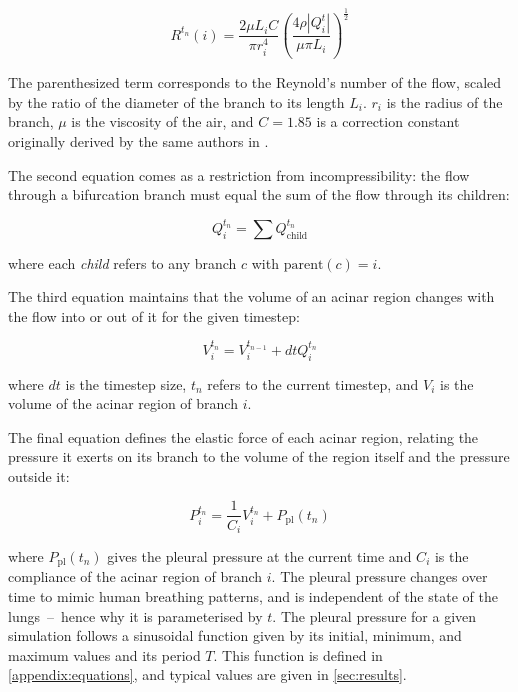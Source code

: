 \begin{equation*}
    R^{t_n}(i) = \frac{2 \mu L_i C}{\pi r_i^4} \left( \frac{4 \rho |Q_i^t|}{\mu \pi L_i} \right)^{\frac{1}{2}}
\end{equation*}

The parenthesized term corresponds to the Reynold's number of the flow, scaled by the ratio of the
diameter of the branch to its length $L_i$. $r_i$ is the radius of the branch, $\mu$ is the
viscosity of the air, and $C = 1.85$ is a correction constant originally derived by the same authors
in \cite{PedleyEtAl1970a}.

\breakpars

The second equation comes as a restriction from incompressibility: the flow through a bifurcation
branch must equal the sum of the flow through its children:

\begin{equation}
    Q_i^{t_n} = \sum Q_{\text{child}}^{t_n}
\end{equation}

\noindent
where each \textit{child} refers to any branch $c$ with $\text{parent}(c) = i$.

The third equation maintains that the volume of an acinar region changes with the flow into or out
of it for the given timestep:

\begin{equation}
    V_i^{t_n} = V_i^{t_{n-1}} + dt Q_i^{t_n}
\end{equation}

\noindent
where $dt$ is the timestep size, $t_n$ refers to the current timestep, and $V_i$ is the volume of the
acinar region of branch $i$.

The final equation defines the elastic force of each acinar region, relating the pressure it exerts
on its branch to the volume of the region itself and the pressure outside it:

\begin{equation} \label{eq:volume-cons-naive}
    P_i^{t_n} = \frac{1}{C_i} V_i^{t_n} + P_{\text{pl}}(t_n)
\end{equation}

\noindent
where $P_{\text{pl}}(t_n)$ gives the pleural pressure at the current time and $C_i$ is the
compliance of the acinar region of branch $i$. The pleural pressure changes over time to mimic human
breathing patterns, and is independent of the state of the lungs~--~hence why it is parameterised by
$t$. The pleural pressure for a given simulation follows a sinusoidal function given by its initial,
minimum, and maximum values and its period $T$. This function is defined in
\autoref{appendix:equations}, and typical values are given in \autoref{sec:results}.

